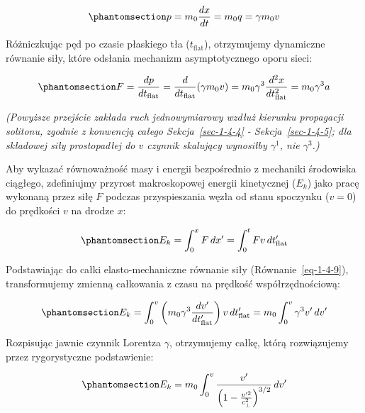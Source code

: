 \documentclass[
  polish,
  letterpaper,
  DIV=11,
  numbers=noendperiod,
  oneside]{scrartcl}
\begin{document}
\begin{equation}\protect\phantomsection\label{eq-1-4-8}{p = m_0 \frac{dx}{dt} = m_0 q = \gamma m_0 v}\end{equation}

Różniczkując pęd po czasie płaskiego tła (\(t_{\text{flat}}\)),
otrzymujemy dynamiczne równanie siły, które odsłania mechanizm
asymptotycznego oporu sieci:

\begin{equation}\protect\phantomsection\label{eq-1-4-9}{F = \frac{dp}{dt_{\text{flat}}} = \frac{d}{dt_{\text{flat}}}(\gamma m_0 v) = m_0 \gamma^3 \frac{d^2 x}{dt_{\text{flat}}^2} = m_0 \gamma^3 a}\end{equation}

\emph{(Powyższe przejście zakłada ruch jednowymiarowy wzdłuż kierunku
propagacji solitonu, zgodnie z konwencją całego Sekcja~\ref{sec-1-4-4} -
Sekcja~\ref{sec-1-4-5}; dla składowej siły prostopadłej do \(v\) czynnik
skalujący wynosiłby \(\gamma^1\), nie \(\gamma^3\).)}

Aby wykazać równoważność masy i energii bezpośrednio z mechaniki
środowiska ciągłego, zdefiniujmy przyrost makroskopowej energii
kinetycznej (\(E_k\)) jako pracę wykonaną przez siłę \(F\) podczas
przyspieszania węzła od stanu spoczynku (\(v=0\)) do prędkości \(v\) na
drodze \(x\):

\begin{equation}\protect\phantomsection\label{eq-1-4-10}{E_k = \int_0^x F \, dx' = \int_0^t F v \, dt_{\text{flat}}'}\end{equation}

Podstawiając do całki elasto-mechaniczne równanie siły
(Równanie~\ref{eq-1-4-9}), transformujemy zmienną całkowania z czasu na
prędkość współrzędnościową:

\begin{equation}\protect\phantomsection\label{eq-1-4-11}{E_k = \int_0^v \left( m_0 \gamma^3 \frac{dv'}{dt_{\text{flat}}'} \right) v \, dt_{\text{flat}}' = m_0 \int_0^v \gamma^3 v' \, dv'}\end{equation}

Rozpisując jawnie czynnik Lorentza \(\gamma\), otrzymujemy całkę, którą
rozwiązujemy przez rygorystyczne podstawienie:

\begin{equation}\protect\phantomsection\label{eq-1-4-12}{E_k = m_0 \int_0^v \frac{v'}{\left(1 - \frac{v'^2}{c_{\perp}^2}\right)^{3/2}} \, dv'}\end{equation}
\end{document}
